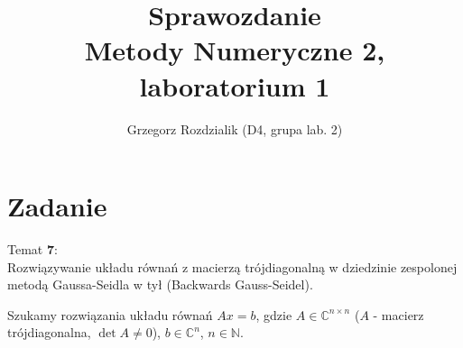 \documentclass[12pt]{article}
\begin{document}
	\title{Sprawozdanie\\Metody Numeryczne 2, laboratorium 1}
	\author{Grzegorz Rozdzialik (D4, grupa lab. 2)}
	\maketitle	

	\section{Zadanie}
	{\Large Temat \textbf{7}:}\\
	Rozwiązywanie układu równań z macierzą trójdiagonalną w dziedzinie zespolonej metodą Gaussa-Seidla w tył (Backwards Gauss-Seidel).
	
	Szukamy rozwiązania układu równań $Ax = b$, gdzie
	$A \in \mathbb{C}^{n \times n}$ ($A$ - macierz trójdiagonalna, $\det{A} \neq 0$),
	$b \in \mathbb{C}^{n}$,
	$n \in \mathbb{N}$.
	
\end{document}
